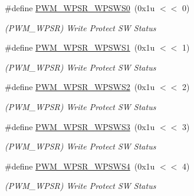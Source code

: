 \begin{DoxyCompactItemize}
\#define \mbox{\hyperlink{group__SAMS70__PWM_ga559d91595e9dc987ce9b85428625ec37}{P\+W\+M\+\_\+\+W\+P\+S\+R\+\_\+\+W\+P\+S\+W\+S0}}~(0x1u $<$$<$ 0)
\begin{DoxyCompactList}\small\item\em (P\+W\+M\+\_\+\+W\+P\+SR) Write Protect SW Status \end{DoxyCompactList}\item 
\mbox{\label{group__SAMS70__PWM_ga46c2d89aefda18e6d8a2fbf9233c8002}} 
\#define \mbox{\hyperlink{group__SAMS70__PWM_ga46c2d89aefda18e6d8a2fbf9233c8002}{P\+W\+M\+\_\+\+W\+P\+S\+R\+\_\+\+W\+P\+S\+W\+S1}}~(0x1u $<$$<$ 1)
\begin{DoxyCompactList}\small\item\em (P\+W\+M\+\_\+\+W\+P\+SR) Write Protect SW Status \end{DoxyCompactList}\item 
\mbox{\label{group__SAMS70__PWM_ga232173f80b5d95a0dc3f3e3ed98973de}} 
\#define \mbox{\hyperlink{group__SAMS70__PWM_ga232173f80b5d95a0dc3f3e3ed98973de}{P\+W\+M\+\_\+\+W\+P\+S\+R\+\_\+\+W\+P\+S\+W\+S2}}~(0x1u $<$$<$ 2)
\begin{DoxyCompactList}\small\item\em (P\+W\+M\+\_\+\+W\+P\+SR) Write Protect SW Status \end{DoxyCompactList}\item 
\mbox{\label{group__SAMS70__PWM_gab2c27c13adebee1cdd31dfe24d11d747}} 
\#define \mbox{\hyperlink{group__SAMS70__PWM_gab2c27c13adebee1cdd31dfe24d11d747}{P\+W\+M\+\_\+\+W\+P\+S\+R\+\_\+\+W\+P\+S\+W\+S3}}~(0x1u $<$$<$ 3)
\begin{DoxyCompactList}\small\item\em (P\+W\+M\+\_\+\+W\+P\+SR) Write Protect SW Status \end{DoxyCompactList}\item 
\mbox{\label{group__SAMS70__PWM_ga5d1554655175492c6bf1cc86448650ef}} 
\#define \mbox{\hyperlink{group__SAMS70__PWM_ga5d1554655175492c6bf1cc86448650ef}{P\+W\+M\+\_\+\+W\+P\+S\+R\+\_\+\+W\+P\+S\+W\+S4}}~(0x1u $<$$<$ 4)
\begin{DoxyCompactList}\small\item\em (P\+W\+M\+\_\+\+W\+P\+SR) Write Protect SW Status \end{DoxyCompactList}\item 
$$
\end{DoxyCompactItemize}
